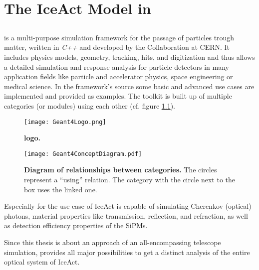 \chapter{The IceAct Model in \geant}

\section{\geant}
\geant is a multi-purpose simulation framework for the passage of particles trough matter, written in \textit{C++} and developed by the \geant Collaboration at CERN. It includes physics models, geometry, tracking, hits, and digitization and thus allows a detailed simulation and response analysis for particle detectors in many application fields like particle and accelerator physics, space engineering or medical science. In the framework's source some basic and advanced use cases are implemented and provided as examples. The toolkit is built up of multiple categories (or modules) using each other (cf. figure \ref{geant4:categories}). \cite{geant4}

\begin{wrapfigure}{r}{0.5\textwidth}
	\centering
	\texttt{[image: Geant4Logo.png]}
	\caption[\geant Logo]{\textbf{\geant logo.} \cite{geant4:logo}}	
\end{wrapfigure}

\begin{figure}[h]
	\centering
	\texttt{[image: Geant4ConceptDiagram.pdf]}
	\caption[\geant category diagram]{\textbf{Diagram of relationships between \geant categories.} \cite{geant4} The circles represent a \enquote{using} relation. The category with the circle next to the box uses the linked one.}	
	\label{geant4:categories}
\end{figure}

Especially for the use case of IceAct \geant is capable of simulating Cherenkov (optical) photons, material properties like transmission, reflection, and refraction, as well as detection efficiency properties of the SiPMs.

Since this thesis is about an approach of an all-encompassing telescope simulation, \geant provides all major possibilities to get a distinct analysis of the entire optical system of IceAct.

